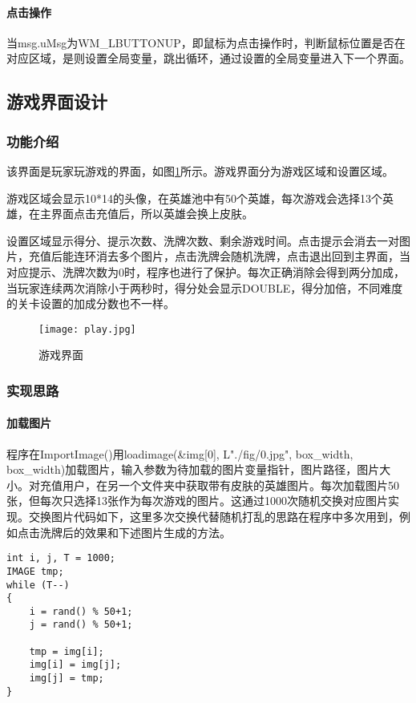 \paragraph{点击操作}

当msg.uMsg为WM\_LBUTTONUP，即鼠标为点击操作时，判断鼠标位置是否在对应区域，是则设置全局变量，跳出循环，通过设置的全局变量进入下一个界面。

\subsection{游戏界面设计}
\subsubsection{功能介绍}
该界面是玩家玩游戏的界面，如图\ref{fig:play}所示。游戏界面分为游戏区域和设置区域。

游戏区域会显示10*14的头像，在英雄池中有50个英雄，每次游戏会选择13个英雄，在主界面点击充值后，所以英雄会换上皮肤。

设置区域显示得分、提示次数、洗牌次数、剩余游戏时间。点击提示会消去一对图片，充值后能连环消去多个图片，点击洗牌会随机洗牌，点击退出回到主界面，当对应提示、洗牌次数为0时，程序也进行了保护。每次正确消除会得到两分加成，当玩家连续两次消除小于两秒时，得分处会显示DOUBLE，得分加倍，不同难度的关卡设置的加成分数也不一样。

\begin{figure}[!htbp]
    \centering
    \texttt{[image: play.jpg]}
    \caption{游戏界面} \label{fig:play}
\end{figure}

\subsubsection{实现思路}
\paragraph{加载图片}
程序在ImportImage()用loadimage(\&img[0], L"./fig/0.jpg", box\_width, box\_width)加载图片，输入参数为待加载的图片变量指针，图片路径，图片大小。对充值用户，在另一个文件夹中获取带有皮肤的英雄图片。每次加载图片50张，但每次只选择13张作为每次游戏的图片。这通过1000次随机交换对应图片实现。交换图片代码如下，这里多次交换代替随机打乱的思路在程序中多次用到，例如点击洗牌后的效果和下述图片生成的方法。
\lstset{language=C}
\begin{lstlisting}
int i, j, T = 1000;
IMAGE tmp;
while (T--)
{
    i = rand() % 50+1;
    j = rand() % 50+1;

    tmp = img[i];
    img[i] = img[j];
    img[j] = tmp;
}
\end{lstlisting}

